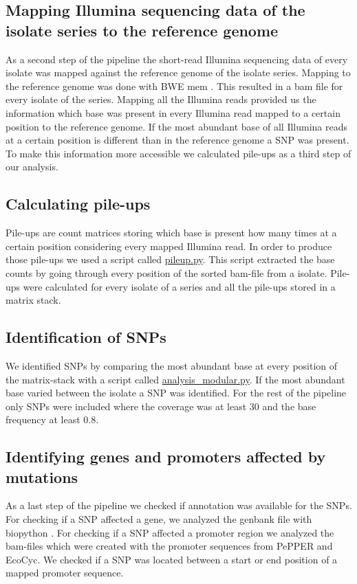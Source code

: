 \subsection{Mapping Illumina sequencing data of the isolate series to the reference genome}
As a second step of the pipeline the short-read Illumina sequencing data of every isolate was mapped against the reference genome of the isolate series. Mapping to the reference genome was done with BWE mem \cite{li_fast_2009}. This resulted in a bam file for every isolate of the series. Mapping all the Illumina reads provided us the information which base was present in every Illumina read mapped to a certain position to the reference genome. If the most abundant base of all Illumina reads at a certain position is different than in the reference genome a SNP was present. To make this information more accessible we calculated pile-ups as a third step of our analysis. 

\subsection{Calculating pile-ups}
Pile-ups are count matrices storing which base is present how many times at a certain position considering every mapped Illumina read. In order to produce those pile-ups we used a script called \href{https://github.com/nahanoo/ESBL\_project/pileup.py}{pileup.py}. This script extracted the base counts by going through every position of the sorted bam-file from a isolate. Pile-ups were calculated for every isolate of a series and all the pile-ups stored in a matrix stack.

\subsection{Identification of SNPs} 
We identified SNPs by comparing the most abundant base at every position of the matrix-stack with a script called \href{https://github.com/nahanoo/ESBL\_project/pileup.py}{analysis\_modular.py}. If the most abundant base varied between the isolate a SNP was identified. For the rest of the pipeline only SNPs were included where the coverage was at least 30 and the base frequency at least 0.8.

\subsection{Identifying genes and promoters affected by mutations}
As a last step of the pipeline we checked if annotation was available for the SNPs. For checking if a SNP affected a gene, we analyzed the genbank file with biopython \cite{cock_biopython:_2009}. For checking if a SNP affected a promoter region we analyzed the bam-files which were created with the promoter sequences from PePPER and EcoCyc. We checked if a SNP was located between a start or end position of a mapped promoter sequence. 

